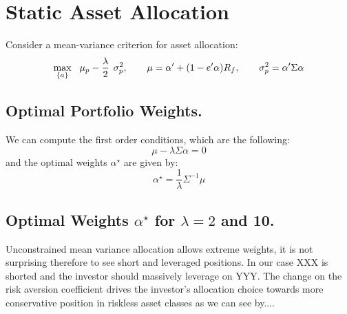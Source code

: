 \chapter{Static Asset Allocation}
Consider a mean-variance criterion for asset allocation:
\begin{equation}
    \underset{\{ a\}}{\textrm{max}} \hspace{0.3cm} \mu_p - \frac{\lambda}{2} \hspace{0.15cm} \sigma_p ^2 , \hspace{0.7cm} \mu = \alpha ' + (1 - e' \alpha)R_f, \hspace{0.7cm} \sigma_p ^2 = \alpha' \Sigma \alpha
\end{equation}

\section{Optimal Portfolio Weights.}
We can compute the first order conditions, which are the following:
$$
\mu - \lambda \Sigma \alpha = 0
$$
and the optimal weights $\alpha^\star$ are given by:
$$
\alpha^\star = \frac{1}{\lambda} \Sigma^{-1} \mu
$$


\section{Optimal Weights $\alpha^\star$ for $\lambda = 2$ and 10.}


Unconstrained mean variance allocation allows extreme weights, it is not surprising therefore to see short and leveraged positions. In our case XXX is shorted and the investor should massively leverage on YYY. The change on the risk aversion coefficient drives the investor's allocation choice towards more conservative position in riskless asset classes as we can see by....